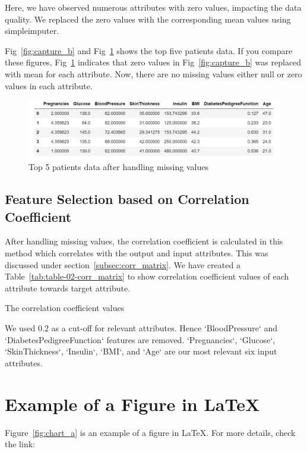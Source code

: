 Here, we have observed numerous attributes with zero values, impacting the data quality. We replaced the zero values with the corresponding mean values using simpleimputer.

Fig~\ref{fig:capture_b} and Fig~\ref{fig:capture_f} shows the top five patients data. If you compare these figures, Fig~\ref{fig:capture_f} indicates that zero values in Fig~\ref{fig:capture_b} was replaced with mean for each attribute. Now, there are no missing values either null or zero values in each attribute.

\begin{figure}[ht]
    \centering    \includegraphics[scale=0.8]{figures/data_info_after_imputer.pdf}
    \caption{Top 5 patients data after handling missing values}
    \label{fig:capture_f}
\end{figure}

\subsection{Feature Selection based on Correlation Coefficient}
After handling missing values, the correlation coefficient is calculated in this method which correlates with the output and input attributes. This was discussed under section~\ref{subsec:corr_matrix}. We have created a Table~\ref{tab:table-02-corr_matrix} to show correlation coefficient values of each attribute towards target attribute.

 \begin{table}[ht!]
    \centering
    \caption{The correlation coefficient values}
    
    \label{tab:table-02-corr_matrix}
\end{table}

We used 0.2 as a cut-off for relevant attributes. Hence   `BloodPressure` and `DiabetesPedigreeFunction` features are removed. `Pregnancies`, `Glucose`, `SkinThickness`, `Insulin`, `BMI`, and `Age` are our most relevant six input attributes.

\section{Example of a Figure in \LaTeX}
Figure~\ref{fig:chart_a} is an example of a figure in \LaTeX. For more details, check the link:

